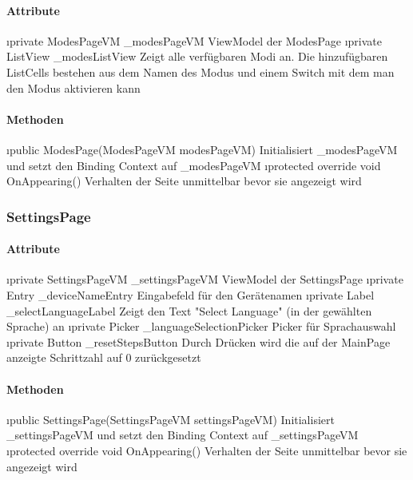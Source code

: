 \documentclass[../entwurf.tex]{subfiles}
\begin{document}
\paragraph{Attribute}
\begin{itemize}
	\i{private ModesPageVM \_modesPageVM} ViewModel der ModesPage
	\i{private ListView \_modesListView} Zeigt alle verfügbaren Modi an. Die hinzufügbaren ListCells bestehen aus dem Namen des Modus und einem Switch mit dem man den Modus aktivieren kann
\end{itemize}

\paragraph{Methoden}

\begin{itemize}
	\i{public ModesPage(ModesPageVM modesPageVM)} Initialisiert \_modesPageVM und setzt den Binding Context 			auf \_modesPageVM
	\i{protected override void OnAppearing()} Verhalten der Seite unmittelbar bevor sie angezeigt wird
\end{itemize}

\subsubsection{SettingsPage}
\paragraph{Attribute}

\begin{itemize}
	\i{private SettingsPageVM \_settingsPageVM} ViewModel der SettingsPage
	\i{private Entry \_deviceNameEntry} Eingabefeld für den Gerätenamen
	\i{private Label \_selectLanguageLabel} Zeigt den Text "Select Language" (in der gewählten Sprache) an
	\i{private Picker \_languageSelectionPicker} Picker für Sprachauswahl
	\i{private Button \_resetStepsButton} Durch Drücken wird die auf der MainPage anzeigte Schrittzahl auf 0 zurückgesetzt
\end{itemize}

\paragraph{Methoden}

\begin{itemize}
	\i{public SettingsPage(SettingsPageVM settingsPageVM)} Initialisiert \_settingsPageVM und setzt den Binding Context 			auf \_settingsPageVM
	\i{protected override void OnAppearing()} Verhalten der Seite unmittelbar bevor sie angezeigt wird
\end{itemize}
\end{document}
